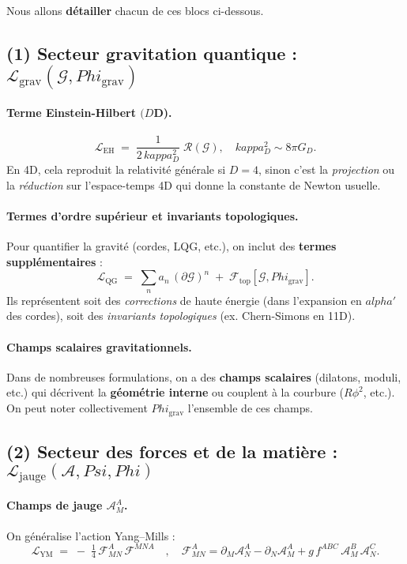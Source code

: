 \documentclass[12pt]{article}
\def\Phi{Phi}%
\def\Psi{Psi}%
\def\kappa{kappa}%
\def\alpha{alpha}%
\begin{document}
Nous allons \textbf{détailler} chacun de ces blocs ci-dessous.

\subsection{(1) Secteur gravitation quantique : \(\mathcal{L}_{\text{grav}}(\mathcal{G},\Phi_{\text{grav}})\)}

\paragraph{Terme Einstein-Hilbert \((D\)D\textbf{)}.}
\[
\mathcal{L}_{\text{EH}}
\;=\;
\frac{1}{2\,\kappa_D^2}\;\mathcal{R}(\mathcal{G}),
\quad
\kappa_D^2 \sim 8\pi G_D.
\]
En 4D, cela reproduit la relativité générale si \(D=4\), 
sinon c'est la \emph{projection} ou la \emph{réduction} sur l'espace-temps 4D 
qui donne la constante de Newton usuelle.

\paragraph{Termes d'ordre supérieur et invariants topologiques.}
Pour quantifier la gravité (cordes, LQG, etc.), on inclut des \textbf{termes supplémentaires} : 
\[
\mathcal{L}_{\text{QG}}
\;=\;
\sum_n a_n\,(\partial\mathcal{G})^n
\;+\;
\mathcal{F}_{\text{top}}[\mathcal{G}, \Phi_{\text{grav}}].
\]
Ils représentent soit des \emph{corrections} de haute énergie (dans l'expansion en \(\alpha'\) des cordes), 
soit des \emph{invariants topologiques} (ex. Chern-Simons en 11D).

\paragraph{Champs scalaires gravitationnels.}
Dans de nombreuses formulations, on a des \textbf{champs scalaires} (dilatons, moduli, etc.) 
qui décrivent la \textbf{géométrie interne} ou couplent à la courbure (\(R\phi^2\), etc.). 
On peut noter collectivement \(\Phi_{\text{grav}}\) l'ensemble de ces champs.

\subsection{(2) Secteur des forces et de la matière : \(\mathcal{L}_{\text{jauge}}(\mathcal{A},\Psi,\Phi)\)}

\paragraph{Champs de jauge \(\mathcal{A}_M^A\).}
On généralise l'action Yang–Mills :
\[
\mathcal{L}_{\text{YM}}
\;=\;
-\;\tfrac14\,\mathcal{F}_{MN}^A\,\mathcal{F}^{MN A}
\quad,\quad
\mathcal{F}_{MN}^A 
=\partial_M \mathcal{A}_N^A-\partial_N \mathcal{A}_M^A+ g\,f^{ABC}\,\mathcal{A}_M^B\,\mathcal{A}_N^C.
\]
\end{document}
